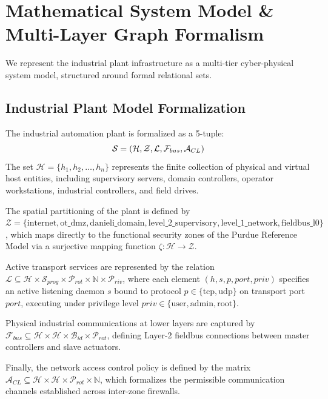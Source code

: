 \documentclass[target=mst,aauheader=aics,style=]{thud}
\begin{document}
\section{Mathematical System Model \& Multi-Layer Graph Formalism}
\label{sec:system_model}
We represent the industrial plant infrastructure as a multi-tier cyber-physical system model, structured around formal relational sets.

\subsection{Industrial Plant Model Formalization}
The industrial automation plant is formalized as a 5-tuple:
\begin{equation}
    \centering
    \mathcal{S} = (\mathcal{H}, \mathcal{Z}, \mathcal{L}, \mathcal{F}_{bus}, \mathcal{A}_{CL})
\end{equation}
The set $\mathcal{H} = \{h_1, h_2, \dots, h_n\}$ represents the finite collection of physical and virtual host entities, including supervisory servers, domain controllers, operator workstations, industrial controllers, and field drives. 

The spatial partitioning of the plant is defined by \\$\mathcal{Z} = \{\text{internet}, \text{ot\_dmz}, \text{danieli\_domain}, \text{level\_2\_supervisory}, \text{level\_1\_network}, \text{fieldbus\_l0}\}$, which maps directly to the functional security zones of the Purdue Reference Model via a surjective mapping function $\zeta: \mathcal{H} \to \mathcal{Z}$. 

Active transport services are represented by the relation $\mathcal{L} \subseteq \mathcal{H} \times \mathcal{S}_{prog} \times \mathcal{P}_{rot} \times \mathbb{N} \times \mathcal{P}_{riv}$, where each element $(h, s, p, port, priv)$ specifies an active listening daemon $s$ bound to protocol $p \in \{\text{tcp}, \text{udp}\}$ on transport port $port$, executing under privilege level $priv \in \{\text{user}, \text{admin}, \text{root}\}$. 

Physical industrial communications at lower layers are captured by $\mathcal{F}_{bus} \subseteq \mathcal{H} \times \mathcal{H} \times \mathcal{B}_{id} \times \mathcal{P}_{rot}$, defining Layer-2 fieldbus connections between master controllers and slave actuators. 

Finally, the network access control policy is defined by the matrix $\mathcal{A}_{CL} \subseteq \mathcal{H} \times \mathcal{H} \times \mathcal{P}_{rot} \times \mathbb{N}$, which formalizes the permissible communication channels established across inter-zone firewalls.
\end{document}
